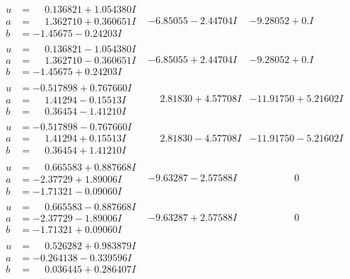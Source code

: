 \documentclass[1p]{elsarticle_modified}
\theoremstyle{definition}
\begin{document}
$$\begin{array}{c|c|c}
\begin{aligned}
u &= \phantom{-}0.136821 + 1.054380 I \\
a &= \phantom{-}1.362710 + 0.360651 I \\
b &= -1.45675 - 0.24203 I\end{aligned}
 & -6.85055 - 2.44704 I & -9.28052 + 0. I\phantom{ +0.000000I} \\ \hline\begin{aligned}
u &= \phantom{-}0.136821 - 1.054380 I \\
a &= \phantom{-}1.362710 - 0.360651 I \\
b &= -1.45675 + 0.24203 I\end{aligned}
 & -6.85055 + 2.44704 I & -9.28052 + 0. I\phantom{ +0.000000I} \\ \hline\begin{aligned}
u &= -0.517898 + 0.767660 I \\
a &= \phantom{-}1.41294 - 0.15513 I \\
b &= \phantom{-}0.36454 - 1.41210 I\end{aligned}
 & \phantom{-}2.81830 + 4.57708 I & -11.91750 + 5.21602 I \\ \hline\begin{aligned}
u &= -0.517898 - 0.767660 I \\
a &= \phantom{-}1.41294 + 0.15513 I \\
b &= \phantom{-}0.36454 + 1.41210 I\end{aligned}
 & \phantom{-}2.81830 - 4.57708 I & -11.91750 - 5.21602 I \\ \hline\begin{aligned}
u &= \phantom{-}0.665583 + 0.887668 I \\
a &= -2.37729 + 1.89006 I \\
b &= -1.71321 - 0.09060 I\end{aligned}
 & -9.63287 - 2.57588 I & \phantom{-0.000000 } 0 \\ \hline\begin{aligned}
u &= \phantom{-}0.665583 - 0.887668 I \\
a &= -2.37729 - 1.89006 I \\
b &= -1.71321 + 0.09060 I\end{aligned}
 & -9.63287 + 2.57588 I & \phantom{-0.000000 } 0 \\ \hline\begin{aligned}
u &= \phantom{-}0.526282 + 0.983879 I \\
a &= -0.264138 - 0.339596 I \\
b &= \phantom{-}0.036445 + 0.286407 I\end{aligned}

\end{array}$$
\end{document}
